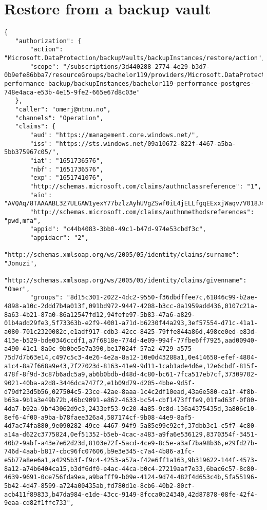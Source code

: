 \section{Restore from a backup vault}
\label{app:pg-restore1}
\begin{verbatim}
{
   "authorization": {
       "action": "Microsoft.DataProtection/backupVaults/backupInstances/restore/action",
       "scope": "/subscriptions/3d440288-2774-4e29-b3d7-0b9efe86bba7/resourceGroups/bachelor119/providers/Microsoft.DataProtection/backupVaults/bachelor119-performance-backup/backupInstances/bachelor119-performance-postgres-748e4aca-e53b-4e15-9fe2-665e67d8c03e"
   },
   "caller": "omerj@ntnu.no",
   "channels": "Operation",
   "claims": {
       "aud": "https://management.core.windows.net/",
       "iss": "https://sts.windows.net/09a10672-822f-4467-a5ba-5bb375967c05/",
       "iat": "1651736576",
       "nbf": "1651736576",
       "exp": "1651741076",
       "http://schemas.microsoft.com/claims/authnclassreference": "1",
       "aio": "AVQAq/8TAAAABL3Z7ULGAW1yexY77bzlzAyhUVgZSwf0iL4jELLfgqEExxjWaqv/V018J4GhfqQcZV9PkxbGEDAvPyhTqxWWhMQVZu9S5OlQB4Ev2uHhnTE=",
       "http://schemas.microsoft.com/claims/authnmethodsreferences": "pwd,mfa",
       "appid": "c44b4083-3bb0-49c1-b47d-974e53cbdf3c",
       "appidacr": "2",
       "http://schemas.xmlsoap.org/ws/2005/05/identity/claims/surname": "Jonuzi",
       "http://schemas.xmlsoap.org/ws/2005/05/identity/claims/givenname": "Omer",
       "groups": "8d15c301-2022-4dc2-9550-f36dbdffee7c,61846c99-b2ae-4898-a10c-2ddd7b4a013f,091bd972-9447-4208-b3cc-8a1959add436,0107c21a-8a63-4b21-87a0-86a12547fd12,94fefe97-5b83-47a6-a829-01b4add29fe3,5f73363b-e2f9-4001-a71d-b6230f44a293,3ef57554-d71c-41a1-a080-701c2320082c,e1adf917-cdb3-42cc-8425-79ffe844a86d,498ce0ed-e83d-413e-b529-bde0346ccdf1,a7f6818e-774d-4e09-994f-77fbe6ff7925,aad00940-a490-41c1-8a0c-9b0be5e7a390,be17024f-57a2-4729-a575-75d7d7b63e14,c497c5c3-4e26-4e2a-8a12-10e0d43288a1,0e414658-efef-4804-a1c4-8a7f668a9e43,7f27023d-8163-41e9-9d11-1cab1ade4d6e,12e6cbdf-815f-478f-8f9d-3c87b6adc5a9,ab6b0bdb-d48d-4c80-bc61-7fca517eb7cf,37309702-9021-40ba-a2d8-3446dca747f2,e1b09d79-d205-4bbe-9d5f-d79df23d5b56,027504c5-23ce-42ae-8aaa-1c4c2df10ead,43a6e580-ca1f-4f8b-b63a-9b1a3e49b72b,46bc9091-e862-4633-bc54-cbf1473fffe9,01fad63f-0f80-4da7-b92a-9bf43062d9c3,2433ef53-9c20-4a85-9c8d-136a4375435d,3a806c10-8ef6-4f00-a9ba-b78faee326a4,587174cf-9b08-44e9-8af5-4d7ac74fa880,9e090282-49ce-4467-94f9-5a85e99c92cf,37dbb3c1-c5f7-4c80-a14a-d622c3775824,0ef51352-b5eb-4cac-a483-a9fa6e536129,8370354f-3451-40b2-9abf-a43e7e62d23d,8103e72f-5acd-4ce9-8c5e-a3af7ba98b36,e29fd27b-746d-4aab-b817-cbc96fc07606,b9e3e345-c7a4-4b86-a1fc-e5b77a8ee6a1,a4295b3f-f9c4-4253-a57a-f42e6ff1a163,9b319622-144f-4573-8a12-a74b6404ca15,b3df6df0-e4ac-44ca-b0c4-27219aaf7e33,6bac6c57-8c80-4639-9691-0ce756fda9ea,a9bafff9-b09e-4124-9d74-482f4d653c4b,5fa55196-5b42-4d47-8599-a724a00435ab,fd780d1e-8cb6-40b2-80cf-acb411f89833,b47da984-e1de-43cc-9149-8fcca0b24340,42d87878-08fe-42f4-9eaa-cd82f1ffc733",

\end{verbatim}

